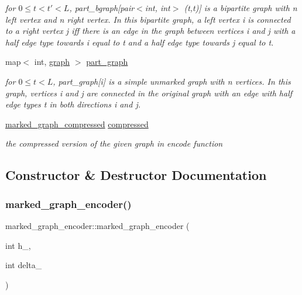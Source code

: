 \begin{DoxyCompactItemize}
\begin{DoxyCompactList}\small\item\em for $0 \leq t < t' < L$, part\+\_\+bgraph\mbox{[}pair$<$int, int$>$ (t,t\textquotesingle{})\mbox{]} is a bipartite graph with n left vertex and n right vertex. In this bipartite graph, a left vertex i is connected to a right vertex j iff there is an edge in the graph between vertices i and j with a half edge type towards i equal to t and a half edge type towards j equal to t\textquotesingle{}. \end{DoxyCompactList}\item 
map$<$ int, \hyperlink{classgraph}{graph} $>$ \hyperlink{classmarked__graph__encoder_adbafd0769ae301acc1b2c19b5e1d4844}{part\+\_\+graph}
\begin{DoxyCompactList}\small\item\em for $0 \leq t < L$, part\+\_\+graph\mbox{[}i\mbox{]} is a simple unmarked graph with n vertices. In this graph, vertices i and j are connected in the original graph with an edge with half edge types t in both directions i and j. \end{DoxyCompactList}\item 
\hyperlink{classmarked__graph__compressed}{marked\+\_\+graph\+\_\+compressed} \hyperlink{classmarked__graph__encoder_ac2ded200860fdd2321f86dd76b28bcb3}{compressed}
\begin{DoxyCompactList}\small\item\em the compressed version of the given graph in encode function \end{DoxyCompactList}\end{DoxyCompactItemize}


\subsection{Constructor \& Destructor Documentation}
\mbox{\label{classmarked__graph__encoder_a128d2a38b23ce620c77d00a5eff487ea}} 
\subsubsection{\texorpdfstring{marked\+\_\+graph\+\_\+encoder()}{marked\_graph\_encoder()}}
{\footnotesize\ttfamily marked\+\_\+graph\+\_\+encoder\+::marked\+\_\+graph\+\_\+encoder (\begin{DoxyParamCaption}\item[{int}]{h\+\_\+,  }\item[{int}]{delta\+\_\+ }\end{DoxyParamCaption})\hspace{0.3cm}{\ttfamily [inline]}}


